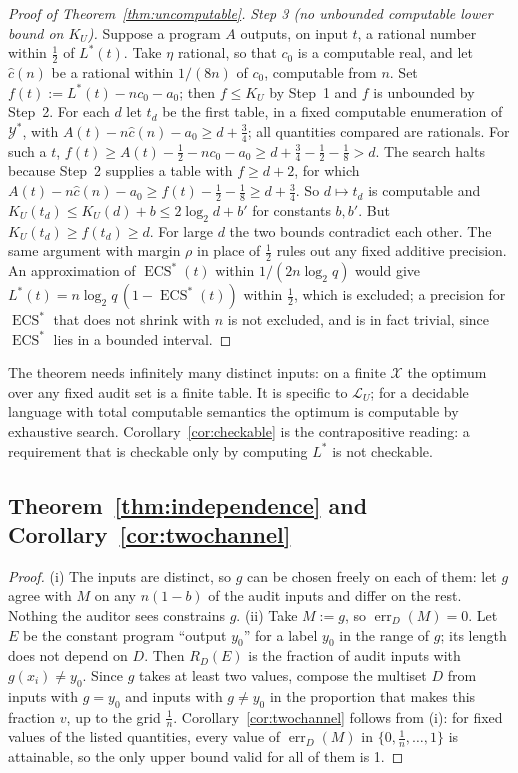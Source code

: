 \documentclass[11pt,letterpaper]{article}
\newcommand{\X}{\mathcal{X}}
\newcommand{\Y}{\mathcal{Y}}
\newcommand{\Lang}{\mathcal{L}}
\newcommand{\LU}{\Lang_{U}}
\newcommand{\D}{D}
\DeclareMathOperator{\ECS}{ECS}
\DeclareMathOperator{\err}{err}
\newcommand{\cz}{c_{0}}
\newcommand{\Ltwo}{\log_{2}}
\theoremstyle{plain}
\theoremstyle{definition}
\theoremstyle{remark}
\begin{document}
\begin{proof}[Proof of Theorem~\ref{thm:uncomputable}]
\emph{Step 3 (no unbounded computable lower bound on $K_U$).} Suppose a program $A$ outputs, on input $t$, a rational number within $\frac12$ of $L^{*}(t)$. Take $\eta$ rational, so that $\cz$ is a computable real, and let $\hat c(n)$ be a rational within $1/(8n)$ of $\cz$, computable from $n$. Set $f(t):=L^{*}(t)-n\cz-a_0$; then $f\le K_U$ by Step~1 and $f$ is unbounded by Step~2. For each $d$ let $t_d$ be the first table, in a fixed computable enumeration of $\Y^{*}$, with $A(t)-n\hat c(n)-a_0\ge d+\frac34$; all quantities compared are rationals. For such a $t$, $f(t)\ge A(t)-\frac12-n\cz-a_0\ge d+\frac34-\frac12-\frac18>d$. The search halts because Step~2 supplies a table with $f\ge d+2$, for which $A(t)-n\hat c(n)-a_0\ge f(t)-\frac12-\frac18\ge d+\frac34$. So $d\mapsto t_d$ is computable and $K_U(t_d)\le K_U(d)+b\le2\Ltwo d+b'$ for constants $b,b'$. But $K_U(t_d)\ge f(t_d)\ge d$. For large $d$ the two bounds contradict each other. The same argument with margin $\rho$ in place of $\frac12$ rules out any fixed additive precision. An approximation of $\ECS^{*}(t)$ within $1/(2n\Ltwo q)$ would give $L^{*}(t)=n\Ltwo q\,(1-\ECS^{*}(t))$ within $\frac12$, which is excluded; a precision for $\ECS^{*}$ that does not shrink with $n$ is not excluded, and is in fact trivial, since $\ECS^{*}$ lies in a bounded interval.
\end{proof}

The theorem needs infinitely many distinct inputs: on a finite $\X$ the optimum over any fixed audit set is a finite table. It is specific to $\LU$; for a decidable language with total computable semantics the optimum is computable by exhaustive search. Corollary~\ref{cor:checkable} is the contrapositive reading: a requirement that is checkable only by computing $L^{*}$ is not checkable.

\subsection{Theorem~\ref{thm:independence} and Corollary~\ref{cor:twochannel}}
\begin{proof}
(i) The inputs are distinct, so $g$ can be chosen freely on each of them: let $g$ agree with $M$ on any $n(1-b)$ of the audit inputs and differ on the rest. Nothing the auditor sees constrains $g$. (ii) Take $M:=g$, so $\err_{\D}(M)=0$. Let $E$ be the constant program ``output $y_0$'' for a label $y_0$ in the range of $g$; its length does not depend on $\D$. Then $R_{\D}(E)$ is the fraction of audit inputs with $g(x_i)\neq y_0$. Since $g$ takes at least two values, compose the multiset $\D$ from inputs with $g=y_0$ and inputs with $g\neq y_0$ in the proportion that makes this fraction $v$, up to the grid $\frac1n$. Corollary~\ref{cor:twochannel} follows from (i): for fixed values of the listed quantities, every value of $\err_{\D}(M)$ in $\{0,\frac1n,\dots,1\}$ is attainable, so the only upper bound valid for all of them is 1.
\end{proof}
\end{document}
